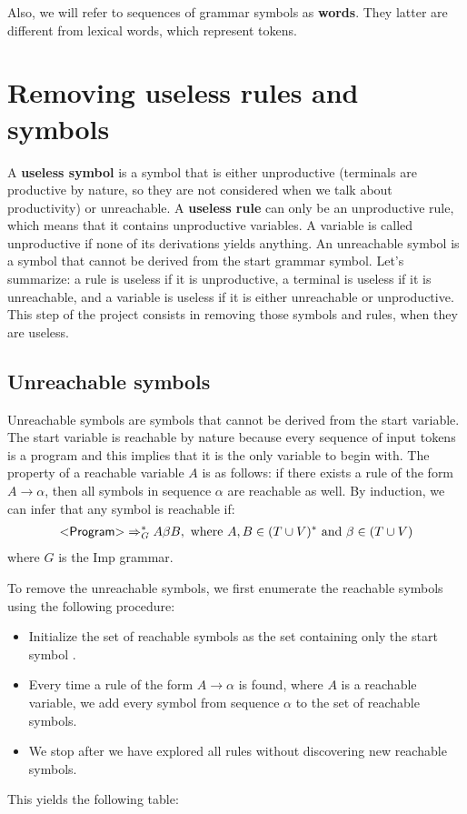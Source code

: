 Also, we will refer to sequences of grammar symbols as \textbf{words}. They latter are different from lexical words, which represent tokens.


\section{Removing useless rules and symbols}

A \textbf{useless symbol} is a symbol that is either unproductive (terminals are productive by nature, so they are not considered when we talk about productivity) or unreachable. A \textbf{useless rule} can only be an unproductive rule, which means that it contains
unproductive variables. A variable is called unproductive if none of its derivations yields anything. An unreachable symbol is a symbol that cannot be derived
from the start grammar symbol. Let's summarize: a rule is useless if it is unproductive, a terminal is useless if it is unreachable, and a variable is useless if it is either unreachable or unproductive. This step of the project consists in removing those symbols and rules, when they are useless.

\subsection{Unreachable symbols}

Unreachable symbols are symbols that cannot be derived from the start variable. The start variable  is reachable by nature
because every sequence of input tokens is a program and this implies that it is the only variable to begin with. 
The property of a reachable variable $A$ is as follows: if there exists a rule of the form $A \rightarrow \alpha$, then all symbols in sequence $\alpha$
are reachable as well. By induction, we can infer that any symbol is reachable if:
\begin{equation}
  \begin{split}
    \varstyle{Program} \Rightarrow_{G}^{*} A \beta B, \text{ where } A, B \in (T \cup V)^{*} \text{ and } \beta \in (T \cup V)
   \end{split}
\end{equation}
where $G$ is the Imp grammar.

To remove the unreachable symbols, we first enumerate the reachable symbols using the following procedure:
\begin{itemize}
  \item Initialize the set of reachable symbols as the set containing only the start symbol .
  \item Every time a rule of the form $A \rightarrow \alpha$ is found, where $A$ is a reachable variable, we add every symbol from sequence $\alpha$
  to the set of reachable symbols.
  \item We stop after we have explored all rules without discovering new reachable symbols.
\end{itemize}
This yields the following table:

